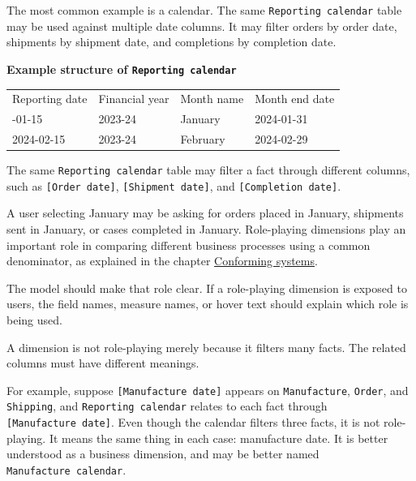 \documentclass[10pt,openany,10pt]{book}
\newcounter{none}
\let\podeToprule\toprule
\let\podeMidrule\midrule
\let\podeBottomrule\bottomrule
\renewcommand{\toprule}{\arrayrulecolor{pbiGrid}\podeToprule}
\renewcommand{\midrule}{\arrayrulecolor{pbiGrid}\podeMidrule}
\renewcommand{\bottomrule}{\arrayrulecolor{pbiGrid}\podeBottomrule}
\begin{document}
The most common example is a calendar. The same
\texttt{\textquotesingle{}Reporting\ calendar\textquotesingle{}} table
may be used against multiple date columns. It may filter orders by order
date, shipments by shipment date, and completions by completion date.

\textbf{Example structure of
\texttt{\textquotesingle{}Reporting\ calendar\textquotesingle{}}}

{\def\LTcaptype{none} %
\begin{longtable}[]{@{}llll@{}}
\toprule\noalign{}
Reporting date & Financial year & Month name & Month end date \\
\midrule\noalign{}
\endhead
\bottomrule\noalign{}
\endlastfoot
2024-01-15 & 2023-24 & January & 2024-01-31 \\
2024-02-15 & 2023-24 & February & 2024-02-29 \\
\end{longtable}
}

The same
\texttt{\textquotesingle{}Reporting\ calendar\textquotesingle{}} table
may filter a fact through different columns, such as
\texttt{{[}Order\ date{]}}, \texttt{{[}Shipment\ date{]}}, and
\texttt{{[}Completion\ date{]}}.

A user selecting January may be asking for orders placed in January,
shipments sent in January, or cases completed in January. Role-playing
dimensions play an important role in comparing different business
processes using a common denominator, as explained in the chapter
\hyperref[docs-creating-information-conforming-systems]{Conforming
systems}.

The model should make that role clear. If a role-playing dimension is
exposed to users, the field names, measure names, or hover text should
explain which role is being used.

A dimension is not role-playing merely because it filters many facts.
The related columns must have different meanings.

For example, suppose \texttt{{[}Manufacture\ date{]}} appears on
\texttt{\textquotesingle{}Manufacture\textquotesingle{}},
\texttt{\textquotesingle{}Order\textquotesingle{}}, and
\texttt{\textquotesingle{}Shipping\textquotesingle{}}, and
\texttt{\textquotesingle{}Reporting\ calendar\textquotesingle{}} relates
to each fact through \texttt{{[}Manufacture\ date{]}}. Even though the
calendar filters three facts, it is not role-playing. It means the same
thing in each case: manufacture date. It is better understood as a
business dimension, and may be better named
\texttt{\textquotesingle{}Manufacture\ calendar\textquotesingle{}}.
\end{document}

